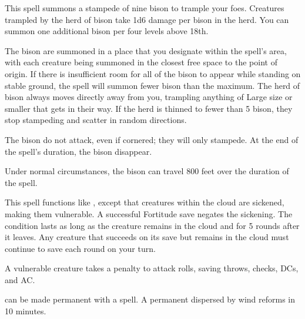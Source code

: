 \spellrng{\rngfar}
\begin{spelleffect}
  This spell summons a stampede of nine bison to trample your foes. Creatures trampled by the herd of bison take 1d6 damage per bison in the herd. You can summon one additional bison per four levels above 18th.
  \par The bison are summoned in a place that you designate within the spell's area, with each creature being summoned in the closest free space to the point of origin. If there is insufficient room for all of the bison to appear while standing on stable ground, the spell will summon fewer bison than the maximum. The herd of bison always moves directly away from you, trampling anything of Large size or smaller that gets in their way. If the herd is thinned to fewer than 5 bison, they stop stampeding and scatter in random directions.
  \par The bison do not attack, even if cornered; they will only stampede. At the end of the spell's duration, the bison disappear.
\end{spelleffect}
\begin{spellnotes}
  Under normal circumstances, the bison can travel 800 feet over the duration of the spell.
\end{spellnotes}

\begin{spelleffect}
  This spell functions like , except that creatures within the cloud are sickened, making them vulnerable. A successful Fortitude save negates the sickening. The condition lasts as long as the creature remains in the cloud and for 5 rounds after it leaves. Any creature that succeeds on its save but remains in the cloud must continue to save each round on your turn.
\end{spelleffect}
\begin{spellnotes}
  A vulnerable creature takes a  penalty to attack rolls, saving throws, checks, DCs, and AC.
  
   can be made permanent with a  spell. A permanent  dispersed by wind reforms in 10 minutes.
\end{spellnotes}

